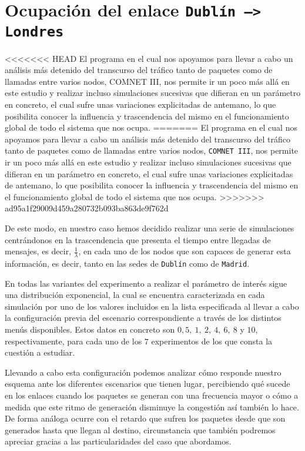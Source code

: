 \documentclass{article}[10pt]
\begin{document}
	\section{Ocupación del enlace \texttt{Dublín --> Londres}}
<<<<<<< HEAD
		El programa en el cual nos apoyamos para llevar a cabo un análisis más detenido del transcurso del tráfico tanto de paquetes como de llamadas entre varios nodos, COMNET III, nos permite ir un poco más allá en este estudio y realizar incluso simulaciones sucesivas que difieran en un parámetro en concreto, el cual sufre unas variaciones explicitadas de antemano, lo que posibilita conocer la influencia y trascendencia del mismo en el funcionamiento global de todo el sistema que nos ocupa.
=======
		El programa en el cual nos apoyamos para llevar a cabo un análisis más detenido del transcurso del tráfico tanto de paquetes como de llamadas entre varios nodos, \texttt{COMNET III}, nos permite ir un poco más allá en este estudio y realizar incluso simulaciones sucesivas que difieran en un parámetro en concreto, el cual sufre unas variaciones explicitadas de antemano, lo que posibilita conocer la influencia y trascendencia del mismo en el funcionamiento global de todo el sistema que nos ocupa.
>>>>>>> ad95a1f29009d459a280732b093ba863de9f762d

		De este modo, en nuestro caso hemos decidido realizar una serie de simulaciones centrándonos en la trascendencia que presenta el tiempo entre llegadas de mensajes, es decir, $\frac{1}{\lambda}$, en cada uno de los nodos que son capaces de generar esta información, es decir, tanto en las sedes de \texttt{Dublín} como de \texttt{Madrid}.

		En todas las variantes del experimento a realizar el parámetro de interés sigue una distribución exponencial, la cual se encuentra caracterizada en cada simulación por uno de los valores incluidos en la lista especificada al llevar a cabo la configuración previa del escenario correspondiente a través de los distintos menús disponibles. Estos datos en concreto son $0,5,\ 1,\ 2,\ 4,\ 6,\ 8$ y $10$, respectivamente, para cada uno de los $7$ experimentos de los que consta la cuestión a estudiar.

		Llevando a cabo esta configuración podemos analizar cómo responde nuestro esquema ante los diferentes escenarios que tienen lugar, percibiendo qué sucede en los enlaces cuando los paquetes se generan con una frecuencia mayor o cómo a medida que este ritmo de generación disminuye la congestión así también lo hace. De forma análoga ocurre con el retardo que sufren los paquetes desde que son generados hasta que llegan al destino, circunstancia que también podremos apreciar gracias a las particularidades del caso que abordamos.
\end{document}

